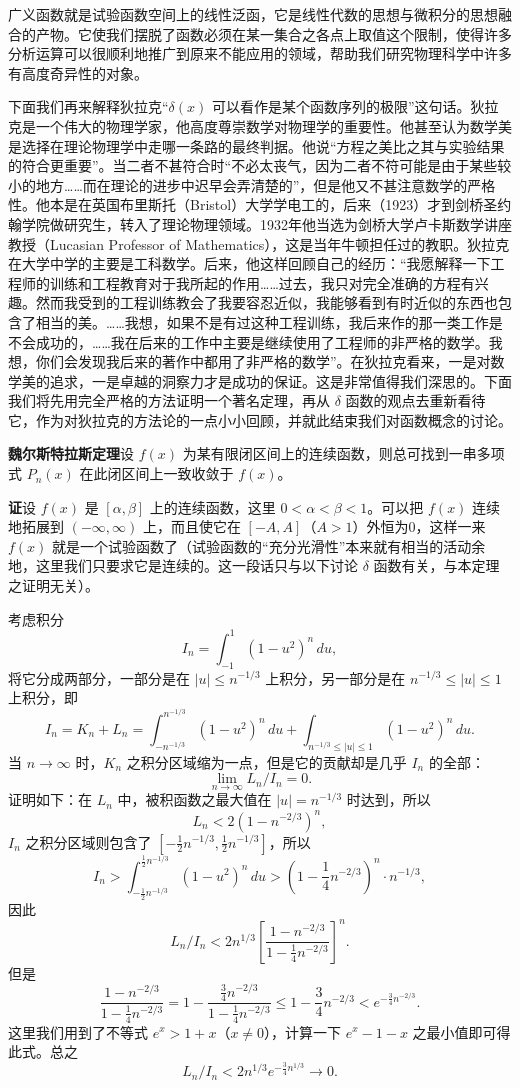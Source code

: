 广义函数就是试验函数空间上的线性泛函，它是线性代数的思想与微积分的思想融合的产物。它使我们摆脱了函数必须在某一集合之各点上取值这个限制，使得许多分析运算可以很顺利地推广到原来不能应用的领域，帮助我们研究物理科学中许多有高度奇异性的对象。

下面我们再来解释狄拉克“$\delta(x)$ 可以看作是某个函数序列的极限”这句话。狄拉克是一个伟大的物理学家，他高度尊崇数学对物理学的重要性。他甚至认为数学美是选择在理论物理学中走哪一条路的最终判据。他说“方程之美比之其与实验结果的符合更重要”。当二者不甚符合时“不必太丧气，因为二者不符可能是由于某些较小的地方……而在理论的进步中迟早会弄清楚的”，但是他又不甚注意数学的严格性。他本是在英国布里斯托（Bristol）大学学电工的，后来（1923）才到剑桥圣约翰学院做研究生，转入了理论物理领域。1932年他当选为剑桥大学卢卡斯数学讲座教授（Lucasian Professor of Mathematics），这是当年牛顿担任过的教职。狄拉克在大学中学的主要是工科数学。后来，他这样回顾自己的经历：“我愿解释一下工程师的训练和工程教育对于我所起的作用……过去，我只对完全准确的方程有兴趣。然而我受到的工程训练教会了我要容忍近似，我能够看到有时近似的东西也包含了相当的美。……我想，如果不是有过这种工程训练，我后来作的那一类工作是不会成功的，……我在后来的工作中主要是继续使用了工程师的非严格的数学。我想，你们会发现我后来的著作中都用了非严格的数学”。在狄拉克看来，一是对数学美的追求，一是卓越的洞察力才是成功的保证。这是非常值得我们深思的。下面我们将先用完全严格的方法证明一个著名定理，再从 $\delta$ 函数的观点去重新看待它，作为对狄拉克的方法论的一点小小回顾，并就此结束我们对函数概念的讨论。

\medskip
\noindent\textbf{魏尔斯特拉斯定理}\quad 设 $f(x)$ 为某有限闭区间上的连续函数，则总可找到一串多项式 $P_n(x)$ 在此闭区间上一致收敛于 $f(x)$。

\noindent\textbf{证}\quad 设 $f(x)$ 是 $[\alpha,\beta]$ 上的连续函数，这里 $0<\alpha<\beta<1$。可以把 $f(x)$ 连续地拓展到 $(-\infty,\infty)$ 上，而且使它在 $[-A,A]$（$A>1$）外恒为0，这样一来 $f(x)$ 就是一个试验函数了（试验函数的“充分光滑性”本来就有相当的活动余地，这里我们只要求它是连续的。这一段话只与以下讨论 $\delta$ 函数有关，与本定理之证明无关）。

考虑积分
\[
I_n=\int_{-1}^1(1-u^2)^n\,du,
\tag{11}
\]
将它分成两部分，一部分是在 $|u|\le n^{-1/3}$ 上积分，另一部分是在 $n^{-1/3}\le |u|\le1$ 上积分，即
\[
I_n=K_n+L_n
=\int_{-n^{-1/3}}^{n^{-1/3}}(1-u^2)^n\,du
+\int_{n^{-1/3}\le |u|\le1}(1-u^2)^n\,du.
\]
当 $n\to\infty$ 时，$K_n$ 之积分区域缩为一点，但是它的贡献却是几乎 $I_n$ 的全部：
\[
\lim_{n\to\infty}L_n/I_n=0.
\]
证明如下：在 $L_n$ 中，被积函数之最大值在 $|u|=n^{-1/3}$ 时达到，所以
\[
L_n<2(1-n^{-2/3})^n,
\]
$I_n$ 之积分区域则包含了 $[-\frac12 n^{-1/3},\frac12 n^{-1/3}]$，所以
\[
I_n>\int_{-\frac12 n^{-1/3}}^{\frac12 n^{-1/3}}(1-u^2)^n\,du
>\left(1-\frac14n^{-2/3}\right)^n\cdot n^{-1/3},
\]
因此
\[
L_n/I_n<2n^{1/3}
\left[
\frac{1-n^{-2/3}}{1-\frac14n^{-2/3}}
\right]^n.
\]
但是
\[
\frac{1-n^{-2/3}}{1-\frac14n^{-2/3}}
=1-\frac{\frac34n^{-2/3}}{1-\frac14n^{-2/3}}
\le1-\frac34n^{-2/3}<e^{-\frac34n^{-2/3}}.
\]
这里我们用到了不等式 $e^x>1+x$（$x\ne0$），计算一下 $e^x-1-x$ 之最小值即可得此式。总之
\[
L_n/I_n<2n^{1/3}e^{-\frac34n^{1/3}}\to0.
\]

